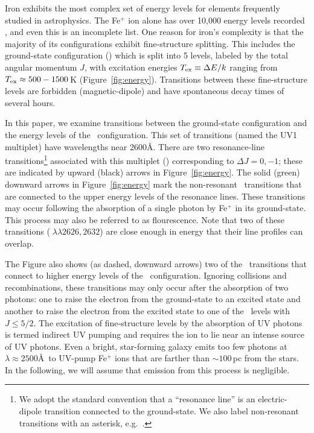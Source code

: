 \documentclass[12pt,preprint]{aastex}
\begin{document}
Iron exhibits the most complex set of energy levels for elements
frequently studied in astrophysics.  The Fe$^+$ ion alone has over
10,000 energy levels recorded \citep{iron}, and even this is an
incomplete list.  
One reason for iron's complexity is
that the majority of its configurations exhibit fine-structure splitting.
This includes the ground-state configuration (\aconfig) which is split
into 5 levels, 
labeled by the total angular momentum $J$, 
with excitation energies $T_{\rm ex} \equiv \Delta E / k$ ranging from
$T_{\rm ex} \approx 500-1500$\,K (Figure~\ref{fig:energy}).  
Transitions between these fine-structure levels are 
forbidden (magnetic-dipole) and have spontaneous decay times of several hours.  

In this paper, we examine transitions between the ground-state
configuration and the energy levels of the \zconfig\
configuration.  This set of transitions (named the
UV1 multiplet) have wavelengths near 2600\AA.
There are two resonance-line transitions\footnote{We adopt the
  standard convention that a ``resonance line'' is an electric-dipole
  transition connected to the ground-state.  We also label
  non-resonant transitions with an asterisk, e.g.\ \feiic.} 
associated with this multiplet (\feiid)
corresponding to $\Delta J = 0, -1$; these are indicated by upward (black) arrows
in Figure~\ref{fig:energy}. The solid (green) downward
arrows in Figure~\ref{fig:energy} mark the non-resonant \feiis\
transitions that are connected to
the upper energy levels of the resonance lines.  These transitions may
occur following the absorption of a single photon by Fe$^+$ in its
ground-state.   This process may also be referred to as flourescence.
Note that two of these transitions (\feiis$\; \lambda\lambda 2626, 2632$) are
close enough in energy that their line profiles can overlap.

The Figure also shows (as dashed, downward arrows) two of the
\feiis\ transitions that connect to higher energy levels of the \zconfig\
configuration.  Ignoring collisions and recombinations, these
transitions may only occur after the absorption
of two photons: one to raise the electron from the ground-state to an
excited state and another to raise the electron from the excited state
to one of the \zconfig\ levels with $J \le 5/2$.  The excitation of
fine-structure levels by 
the absorption of UV photons is termed indirect UV pumping
\citep[e.g][]{silva02,pcb06} and requires the ion to lie
near an intense source of UV photons.  
Even a bright, star-forming galaxy emits too few photons at $\lambda
\approx 2500$\AA\ to UV-pump Fe$^+$ ions that are farther than $\sim
100$\,pc from the stars.
In the
following, we will assume that emission from this process is
negligible.
\end{document}

